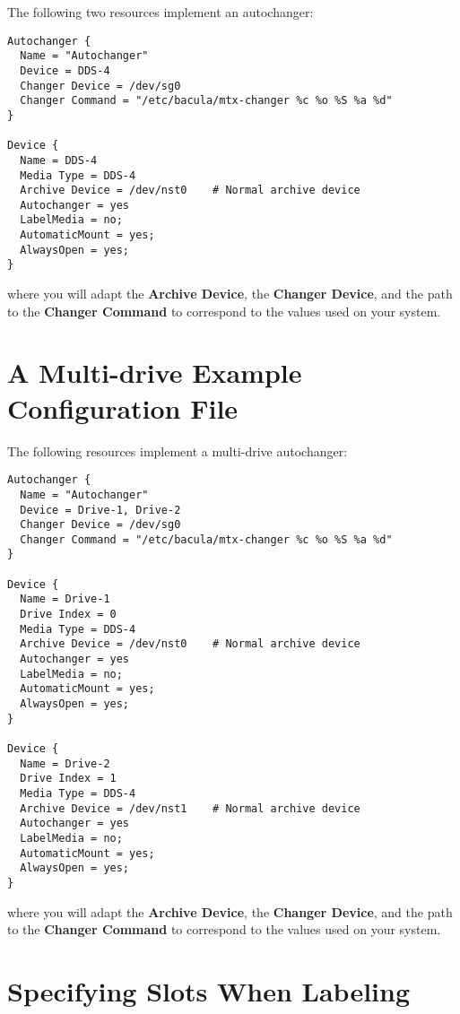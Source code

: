 The following two resources implement an autochanger: 

\footnotesize
\begin{verbatim}
Autochanger {
  Name = "Autochanger"
  Device = DDS-4
  Changer Device = /dev/sg0
  Changer Command = "/etc/bacula/mtx-changer %c %o %S %a %d"
}

Device {
  Name = DDS-4
  Media Type = DDS-4
  Archive Device = /dev/nst0    # Normal archive device
  Autochanger = yes
  LabelMedia = no;
  AutomaticMount = yes;
  AlwaysOpen = yes;
}
\end{verbatim}
\normalsize

where you will adapt the {\bf Archive Device}, the {\bf Changer Device}, and
the path to the {\bf Changer Command} to correspond to the values used on your
system. 

\section{A Multi-drive Example Configuration File}

The following resources implement a multi-drive autochanger: 

\footnotesize
\begin{verbatim}
Autochanger {
  Name = "Autochanger"
  Device = Drive-1, Drive-2
  Changer Device = /dev/sg0
  Changer Command = "/etc/bacula/mtx-changer %c %o %S %a %d"
}

Device {
  Name = Drive-1
  Drive Index = 0
  Media Type = DDS-4
  Archive Device = /dev/nst0    # Normal archive device
  Autochanger = yes
  LabelMedia = no;
  AutomaticMount = yes;
  AlwaysOpen = yes;
}

Device {
  Name = Drive-2
  Drive Index = 1
  Media Type = DDS-4
  Archive Device = /dev/nst1    # Normal archive device
  Autochanger = yes
  LabelMedia = no;
  AutomaticMount = yes;
  AlwaysOpen = yes;
}

\end{verbatim}
\normalsize

where you will adapt the {\bf Archive Device}, the {\bf Changer Device}, and
the path to the {\bf Changer Command} to correspond to the values used on your
system. 

\label{SpecifyingSlots}
\section{Specifying Slots When Labeling}

